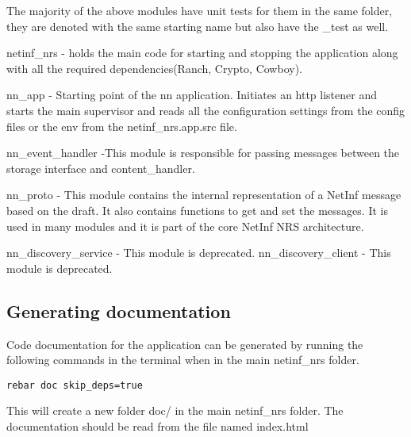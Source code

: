 The majority of the above modules have unit tests for them in the same folder, they are denoted with the same starting name but also have the \_test as well. 

netinf\_nrs - holds the main code for starting and stopping the application along with all the required dependencies(Ranch, Crypto, Cowboy).

nn\_app - Starting point of the nn application. Initiates an http listener and starts the main supervisor and reads all the configuration settings from the config files or the env from the netinf\_nrs.app.src file.

nn\_event\_handler -This module is responsible for passing messages between the storage interface and content\_handler. 

nn\_proto - This module contains the internal representation of a NetInf message based on the draft. It also contains functions to get and set the messages. It is used in many modules and it is part of the core NetInf NRS architecture.

nn\_discovery\_service - This module is deprecated.
nn\_discovery\_client - This module is deprecated.


\subsection{Generating documentation}
\label{bdoc}
Code documentation for the application can be generated by running the following commands in the terminal when in the main netinf\_nrs folder.

\begin{verbatim}
rebar doc skip_deps=true
\end{verbatim}

This will create a new folder doc/ in the main netinf\_nrs folder. The documentation should be read from the file named index.html



